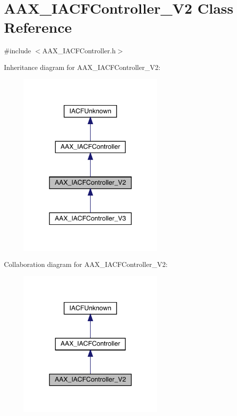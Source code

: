 \hypertarget{a01641}{}\section{A\+A\+X\+\_\+\+I\+A\+C\+F\+Controller\+\_\+\+V2 Class Reference}
\label{a01641}


{\ttfamily \#include $<$A\+A\+X\+\_\+\+I\+A\+C\+F\+Controller.\+h$>$}



Inheritance diagram for A\+A\+X\+\_\+\+I\+A\+C\+F\+Controller\+\_\+\+V2\+:
\nopagebreak
\begin{figure}[H]
\begin{center}
\leavevmode
\includegraphics[width=205pt]{a01640}
\end{center}
\end{figure}


Collaboration diagram for A\+A\+X\+\_\+\+I\+A\+C\+F\+Controller\+\_\+\+V2\+:
\nopagebreak
\begin{figure}[H]
\begin{center}
\leavevmode
\includegraphics[width=205pt]{a01639}
\end{center}
\end{figure}


